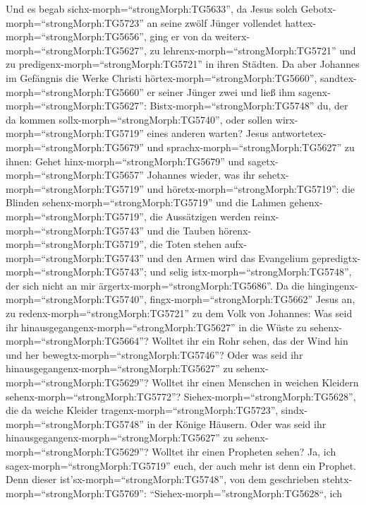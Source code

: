  Und es begab sichx-morph=``strongMorph:TG5633'', da Jesus
solch Gebotx-morph=``strongMorph:TG5723'' an seine zwölf Jünger
vollendet hattex-morph=``strongMorph:TG5656'', ging er von da
weiterx-morph=``strongMorph:TG5627'', zu
lehrenx-morph=``strongMorph:TG5721'' und zu
predigenx-morph=``strongMorph:TG5721'' in ihren Städten.  Da
aber Johannes im Gefängnis die Werke Christi
hörtex-morph=``strongMorph:TG5660'',
sandtex-morph=``strongMorph:TG5660'' er seiner Jünger zwei 
und ließ ihm sagenx-morph=``strongMorph:TG5627'':
Bistx-morph=``strongMorph:TG5748'' du, der da kommen
sollx-morph=``strongMorph:TG5740'', oder sollen
wirx-morph=``strongMorph:TG5719'' eines anderen warten? 
Jesus antwortetex-morph=``strongMorph:TG5679'' und
sprachx-morph=``strongMorph:TG5627'' zu ihnen: Gehet
hinx-morph=``strongMorph:TG5679'' und
sagetx-morph=``strongMorph:TG5657'' Johannes wieder, was ihr
sehetx-morph=``strongMorph:TG5719'' und
höretx-morph=``strongMorph:TG5719'':  die Blinden
sehenx-morph=``strongMorph:TG5719'' und die Lahmen
gehenx-morph=``strongMorph:TG5719'', die Aussätzigen werden
reinx-morph=``strongMorph:TG5743'' und die Tauben
hörenx-morph=``strongMorph:TG5719'', die Toten stehen
aufx-morph=``strongMorph:TG5743'' und den Armen wird das Evangelium
gepredigtx-morph=``strongMorph:TG5743'';  und selig
istx-morph=``strongMorph:TG5748'', der sich nicht an mir
ärgertx-morph=``strongMorph:TG5686''.  Da die
hingingenx-morph=``strongMorph:TG5740'',
fingx-morph=``strongMorph:TG5662'' Jesus an, zu
redenx-morph=``strongMorph:TG5721'' zu dem Volk von Johannes: Was seid
ihr hinausgegangenx-morph=``strongMorph:TG5627'' in die Wüste zu
sehenx-morph=``strongMorph:TG5664''? Wolltet ihr ein Rohr sehen, das der
Wind hin und her bewegtx-morph=``strongMorph:TG5746''?  Oder
was seid ihr hinausgegangenx-morph=``strongMorph:TG5627'' zu
sehenx-morph=``strongMorph:TG5629''? Wolltet ihr einen Menschen in
weichen Kleidern sehenx-morph=``strongMorph:TG5772''?
Siehex-morph=``strongMorph:TG5628'', die da weiche Kleider
tragenx-morph=``strongMorph:TG5723'', sindx-morph=``strongMorph:TG5748''
in der Könige Häusern.  Oder was seid ihr
hinausgegangenx-morph=``strongMorph:TG5627'' zu
sehenx-morph=``strongMorph:TG5629''? Wolltet ihr einen Propheten sehen?
Ja, ich sagex-morph=``strongMorph:TG5719'' euch, der auch mehr ist denn
ein Prophet.  Denn dieser
ist'sx-morph=``strongMorph:TG5748'', von dem geschrieben
stehtx-morph=``strongMorph:TG5769'':
``Siehex-morph=''strongMorph:TG5628``, ich
